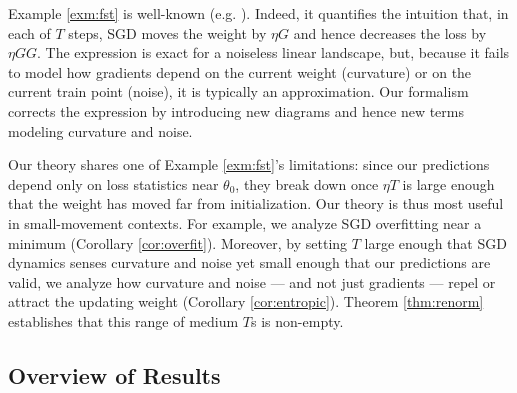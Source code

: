 \documentclass{article}
\theoremstyle{plain}
\theoremstyle{definition}
\begin{document}
        Example \ref{exm:fst} is well-known (e.g. \citet{ne04}).  Indeed, it 
        quantifies the intuition that, in each of $T$ steps, SGD moves the
        weight by $\eta G$ and hence decreases the loss by $\eta GG$.  The
        expression is exact for a noiseless linear landscape, but, because it
        fails to model how gradients depend on the current weight (curvature)
        or on the current train point (noise), it is typically an
        approximation.  Our formalism corrects the expression by introducing 
        new diagrams and hence new terms modeling curvature and noise.

        Our theory shares one of Example \ref{exm:fst}'s limitations: since our
        predictions depend only on loss statistics near $\theta_0$, they break
        down once $\eta T$ is large enough that the weight has moved far from
        initialization.  Our theory is thus most useful in small-movement
        contexts.  For example, we analyze SGD overfitting near a minimum
        (Corollary \ref{cor:overfit}).  Moreover, by setting $T$ large enough
        that SGD dynamics senses curvature and noise yet small enough that our
        predictions are valid, we analyze how curvature and noise --- and not
        just gradients --- repel or attract the updating weight
        (Corollary \ref{cor:entropic}).  Theorem \ref{thm:renorm} establishes
        that this range of medium $T$s is non-empty. 



    \subsection{Overview of Results}


\end{document}
